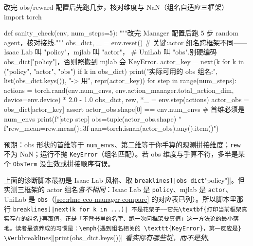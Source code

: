 \begin{codebox}[Python]{改完 obs/reward 配置后先跑几步，核对维度与 NaN（组名自适应三框架）}
import torch

def sanity_check(env, num_steps=5):
    """改完 Manager 配置后跑 5 步 random agent，核对接线."""
    obs_dict, _ = env.reset()
    # 关键:actor 组名跨框架不同——Isaac Lab 叫 "policy"，mjlab 叫 "actor"，
    # UniLab 叫 "obs".别硬编码 obs_dict["policy"]，否则照搬到 mjlab 会 KeyError.
    actor_key = next(k for k in ("policy", "actor", "obs") if k in obs_dict)
    print("实际可用的 obs 组名:", list(obs_dict.keys()), "-> 用", repr(actor_key))
    for step in range(num_steps):
        actions = torch.rand(env.num_envs,
                             env.action_manager.total_action_dim,
                             device=env.device) * 2.0 - 1.0
        obs_dict, rew, *_ = env.step(actions)
        actor_obs = obs_dict[actor_key]
        assert actor_obs.shape[0] == env.num_envs        # 首维必须是 num_envs
        print(f"[step {step}] obs={tuple(actor_obs.shape)} "
              f"rew_mean={rew.mean():.3f} nan={torch.isnan(actor_obs).any().item()}")
\end{codebox}

预期：obs 形状的首维等于 \verb|num_envs|、第二维等于你手算的观测拼接维度；\verb|rew| 不为 NaN；运行不抛 \verb|KeyError|（组名匹配）。若 obs 维度与手算不符，多半是某个 \verb|ObsTerm| 没生效或拼接顺序有误。

\begin{pitfall}
上面的诊断脚本最初是 Isaac Lab 风格、取 \Verb[breaklines]|obs_dict["policy"]|。但实测三框架的 actor 组名\emph{各不相同}：Isaac Lab 是 \verb|policy|、mjlab 是 \verb|actor|、UniLab 是 \verb|obs|（\cref{sec:rlmc-eco-manager-compare} 的对应表已列）。所以脚本里那行 \Verb[breaklines]|next(k for k in ...)| 不是花架子——它先\textbf{打印当前框架真实存在的组名}再取值，正是「不背书里的名字、跑一次问框架要真值」这一方法论的最小落地。读者最该养成的习惯是：\emph{遇到组名相关的 \texttt{KeyError}，第一反应是} \Verb[breaklines]|print(obs_dict.keys())| \emph{看实际有哪些键，而不是猜}。
\end{pitfall}

